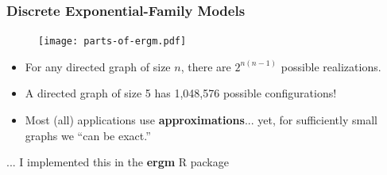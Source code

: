 \documentclass[aspectratio=169,9pt,handout]{beamer}
\begin{document}
\begin{frame}[t,label=discrete-exponential]
	
	\frametitle{Discrete Exponential-Family Models}
	
	\begin{figure}
		\texttt{[image: parts-of-ergm.pdf]}
	\end{figure}\pause
	
	\vfill
		
	\begin{itemize}
		\item For any directed graph of size $n$, there are $2^{n(n - 1)}$ possible realizations.\pause
		\item A directed graph of size 5 has 1,048,576 possible configurations!\pause
		\item Most (all) applications use \textbf{approximations}...\pause{} yet, for sufficiently small graphs we ``can be exact.''
	\end{itemize}\pause

\bigskip

	\hfill\Large ... I implemented this in the \textbf{ergm\color{usccardinal}{ito}} R package\normalsize
	
	\vfill\hfill\hyperlink{discrete-exponential-theory}{} %
	\hyperlink{ergm-terms}{}

	
\end{frame}


%	
\end{document}
